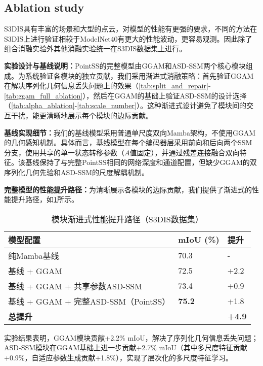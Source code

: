 \documentclass[preprint,12pt]{elsarticle}
\begin{document}
\subsection{Ablation study}
S3DIS具有丰富的场景和大型的点云，对模型的性能有更强的要求，不同的方法在S3DIS上进行验证相较于ModelNet40有更大的性能波动，更容易观测。因此除了组合消融实验外其他消融实验统一在S3DIS数据集上进行。

\textbf{实验设计与基线说明：}PointSS的完整模型由GGAM和ASD-SSM两个核心模块组成。为系统验证各模块的独立贡献，我们采用渐进式消融策略：首先验证GGAM在解决序列化几何信息丢失问题上的效果（\cref{tab:split_and_repair}-\cref{tab:ggam_full_ablation}），然后在GGAM的基础上验证ASD-SSM的设计选择（\cref{tab:alpha_ablation}-\cref{tab:scale_number}）。这种渐进式设计避免了模块间的交互干扰，能更清晰地展示每个模块的边际贡献。

\textbf{基线实现细节：}我们的基线模型采用普通单尺度双向Mamba架构，不使用GGAM的几何感知机制。具体而言，基线模型在每个编码器层采用前向和后向两个SSM分支，使用共享的单一状态转移参数（$\overline{A}$值固定），并通过残差连接融合双向特征。该基线保持了与完整PointSS相同的网络深度和通道配置，但缺少GGAM的双序列化几何先验和ASD-SSM的尺度解耦机制。

\textbf{完整模型的性能提升路径：}为清晰展示各模块的边际贡献，我们提供了渐进式的性能提升路径，如\cref{tab:progressive_improvement}所示。

\begin{table}[htbp!]
	\centering
	\caption{模块渐进式性能提升路径（S3DIS数据集）}
	\label{tab:progressive_improvement}
	\begin{tabular}{@{}lll@{}}
		\toprule
		\textbf{模型配置} & \textbf{mIoU (\%)} & \textbf{提升} \\
		\midrule
		纯Mamba基线 & 70.3 & - \\
		基线 + GGAM & 72.5 & +2.2 \\
		基线 + GGAM + 共享参数ASD-SSM & 73.4 & +0.9 \\
		基线 + GGAM + 完整ASD-SSM（PointSS） & \textbf{75.2} & +1.8 \\
		\midrule
		\multicolumn{2}{l}{\textbf{总提升}} & \textbf{+4.9} \\
		\bottomrule
	\end{tabular}
\end{table}


实验结果表明，GGAM模块贡献+2.2\% mIoU，解决了序列化几何信息丢失问题；ASD-SSM模块在GGAM基础上进一步贡献+2.7\% mIoU（其中多尺度特征贡献+0.9\%，自适应参数生成贡献+1.8\%），实现了层次化的多尺度特征学习。
\end{document}
